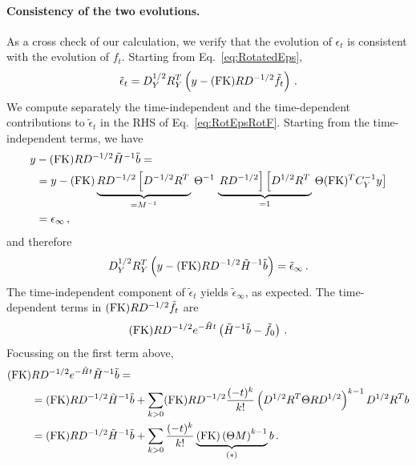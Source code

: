 \documentclass[11pt]{article}
\begin{document}
\paragraph{Consistency of the two evolutions.}
As a cross check of our calculation, we verify that the evolution of 
$\epsilon_t$ is consistent with the evolution of $f_t$. Starting from Eq.~\ref{eq:RotatedEps}, 
\begin{align}
    \label{eq:RotEpsRotF}
    \tilde\epsilon_t = D_Y^{1/2} R_Y^T 
        \left(y - (\mathrm{FK}) R D^{-1/2} \tilde{f}_t\right)\, . 
\end{align}
We compute separately the time-independent and the time-dependent contributions to $\tilde\epsilon_t$ 
in the RHS of Eq.~\ref{eq:RotEpsRotF}. 
Starting from the time-independent terms, we have
\begin{align}
    y &- (\mathrm{FK}) R D^{-1/2} \tilde{H}^{-1} \tilde{b} = \nonumber \\ 
    &= y - (\mathrm{FK}) \underbrace{R D^{-1/2} \left[D^{-1/2} R^T\right.}_{=M^{-1}} \left. \Theta^{-1} \right. \underbrace{\left.R D^{-1/2}\right] 
        \left[D^{1/2} R^T\right.}_{=1} \left. \Theta (\mathrm{FK})^T C_Y^{-1} y\right] \nonumber \\
    \label{eq:TimeIndepEpsCheck}
    &= \epsilon_\infty\, ,
\end{align}
and therefore
\begin{align}
    D_Y^{1/2} R_Y^T \left(
        y - (\mathrm{FK}) R D^{-1/2} \tilde{H}^{-1} \tilde{b}
    \right) = \tilde{\epsilon}_\infty\, .
\end{align}
The time-independent component of $\tilde{\epsilon}_t$ yields $\tilde{\epsilon}_\infty$, as expected. 
The time-dependent terms in $(\mathrm{FK}) R D^{-1/2} \tilde{f}_t$ are
\begin{align}
    \label{eq:TimeDependentContribEpsTilde}
    (\mathrm{FK}) R D^{-1/2} e^{-\tilde{H}t} \left(\tilde{H}^{-1} \tilde{b} - \tilde{f}_0\right)\, .
\end{align}
Focussing on the first term above, 
\begin{align}
    (\mathrm{FK}) &R D^{-1/2} e^{-\tilde{H}t} \tilde{H}^{-1} \tilde{b} = \nonumber \\
    & = (\mathrm{FK}) R D^{-1/2} \tilde{H}^{-1} \tilde{b} + \sum_{k>0} (\mathrm{FK}) R D^{-1/2} \frac{(-t)^k}{k!} \left(
        D^{1/2} R^T \Theta R D^{1/2}
    \right)^{k-1} D^{1/2} R^T b \nonumber \\
    & = (\mathrm{FK}) R D^{-1/2} \tilde{H}^{-1} \tilde{b} + \sum_{k>0} \frac{(-t)^k}{k!} \underbrace{(\mathrm{FK}) \left(\Theta M\right)^{k-1}}_{(*)} b\, .
\end{align}
\end{document}
